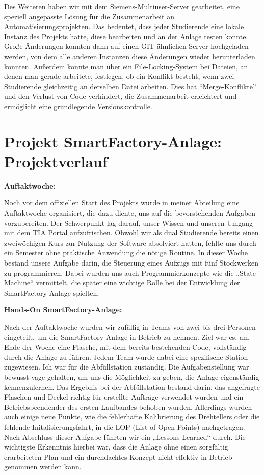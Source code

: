 Des Weiteren haben wir mit dem Siemens-Multiuser-Server gearbeitet, eine  speziell angepasste Lösung für die Zusammenarbeit an 
Automatisierungsprojekten. Das bedeutet, dass jeder Studierende eine lokale 
Instanz des Projekts hatte, diese bearbeiten und an der Anlage testen konnte. Große Änderungen konnten dann auf einen 
GIT-ähnlichen Server hochgeladen werden, von dem alle anderen Instanzen diese Änderungen wieder herunterladen konnten. 
Außerdem konnte man über ein File-Locking-System bei Dateien, an denen man gerade arbeitete, festlegen, ob ein Konflikt 
besteht, wenn zwei Studierende gleichzeitig an derselben Datei arbeiten. Dies hat ``Merge-Konflikte'' und den Verlust 
von Code verhindert, die Zusammenarbeit erleichtert und ermöglicht eine grundlegende Versionskontrolle.

\section{Projekt SmartFactory-Anlage: Projektverlauf}

\textbf{Auftaktwoche:}

Noch vor dem offiziellen Start des Projekts wurde in meiner Abteilung eine Auftaktwoche organisiert, die dazu diente, 
uns auf die bevorstehenden Aufgaben vorzubereiten. Der Schwerpunkt lag darauf, unser Wissen und unseren Umgang mit dem 
TIA Portal aufzufrischen. Obwohl wir als dual Studierende bereits einen zweiwöchigen Kurs zur Nutzung der Software 
absolviert hatten, fehlte uns durch ein Semester ohne praktische Anwendung die nötige Routine. In dieser Woche bestand 
unsere Aufgabe darin, die Steuerung eines Aufzugs mit fünf Stockwerken zu programmieren. Dabei wurden uns auch 
Programmierkonzepte wie die „State Machine“ vermittelt, die später eine wichtige Rolle bei der Entwicklung der 
SmartFactory-Anlage spielten.

\textbf{Hands-On SmartFactory-Anlage:}

Nach der Auftaktwoche wurden wir zufällig in Teams von zwei bis drei Personen eingeteilt, um die SmartFactory-Anlage 
in Betrieb zu nehmen. Ziel war es, am Ende der Woche eine Flasche, mit dem bereits bestehenden Code, vollständig durch 
die Anlage zu führen. Jedem Team wurde dabei eine spezifische Station zugewiesen. Ich war für die Abfüllstation zuständig. 
Die Aufgabenstellung war bewusst vage gehalten, um uns die Möglichkeit zu geben, die Anlage eigenständig kennenzulernen. 
Das Ergebnis bei der Abfüllstation bestand darin, das angefragte Flaschen und Deckel richtig für erstellte Aufträge 
verwendet wurden und ein Betriebsbeendender des ersten Laufbandes behoben wurden. Allerdings wurden auch einige neue Punkte, 
wie die fehlerhafte Kalibrierung des Drehtellers oder die fehlende Initalisierungsfahrt, in die LOP (List of Open Points) 
nachgetragen. Nach Abschluss dieser Aufgabe führten wir ein „Lessons Learned“ durch. Die wichtigste Erkenntnis hierbei war, 
dass die Anlage ohne einen sorgfältig erarbeiteten Plan und ein durchdachtes Konzept nicht effektiv in Betrieb 
genommen werden kann.

